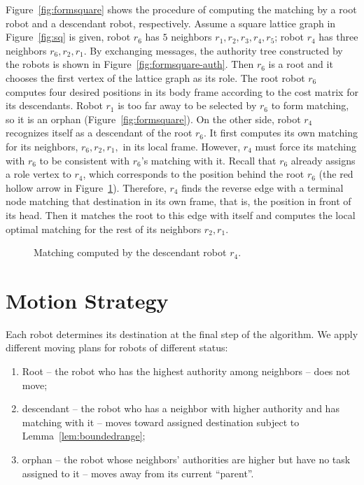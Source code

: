 Figure~\ref{fig:formsquare} shows the procedure of computing the matching by a root robot and a descendant robot, respectively. 
%
Assume a square lattice graph in Figure~\ref{fig:sq} is given, robot $r_6$ has $5$ neighbors $r_1, r_2, r_3, r_4, r_5$;
robot $r_4$ has three neighbors $r_6, r_2, r_1$. 
%
By exchanging messages, the authority tree constructed by the robots is shown in Figure~\ref{fig:formsquare-auth}.
%
Then $r_6$ is a root and it chooses the first vertex of the lattice graph as its role.
%
The root robot $r_6$ computes four desired positions in its body frame according to the cost matrix for its descendants.
%
Robot $r_1$ is too far away to be selected by $r_6$ to form matching, so it is an orphan (Figure~\ref{fig:formsquare}).
%
On the other side, robot $r_4$ recognizes itself as a descendant of the root $r_6$.
%
It first computes its own matching for its neighbors, $r_6, r_2, r_1,$ in its local frame. 
%
However, $r_4$ must force its matching with $r_6$ to be consistent with $r_6$'s matching with it.
%
Recall that $r_6$ already assigns a role vertex to $r_4$, which corresponds to the position behind the root $r_6$ (the red hollow arrow in Figure~\ref{fig:formsquare-des}).
%
Therefore, $r_4$ finds the reverse edge with a terminal node matching that destination in its own frame, that is, the position in front of its head. 
%
Then it matches the root to this edge with itself and computes the local optimal matching for the rest of its neighbors $r_2, r_1$.

\begin{figure}
    \centering
    \begin{minipage}{0.9\textwidth}
    \centering
    
    \end{minipage}
    \caption{Matching computed by the descendant robot $r_4$.}
    \label{fig:formsquare-des}
\end{figure}

\section{Motion Strategy}
\label{sec:motion}

Each robot determines its destination at the final step of the algorithm.  
%
We apply different moving plans for robots of different status:
\begin{enumerate}
\item Root -- the robot who has the highest authority among neighbors -- does not move;
\item descendant -- the robot who has a neighbor with higher authority and has matching with it -- moves toward assigned destination subject to Lemma~\ref{lem:boundedrange};
\item orphan -- the robot whose neighbors' authorities are higher but have no task assigned to it -- moves away from its current ``parent''.
\end{enumerate} 


